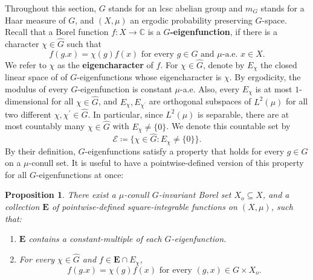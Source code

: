 \documentclass{amsart}
\numberwithin{equation}{subsection}
\newtheorem{prop}[thm]{Proposition}
\theoremstyle{remark}
\begin{document}
Throughout this section, \(G\) stands for an lcsc abelian group and \(m_{G}\) stands for a Haar measure of \(G\), and \(\left(X,\mu\right)\) an ergodic probability preserving \(G\)-space. Recall that a Borel function \(f:X\to\mathbb{C}\) is a {\bf \(G\)-eigenfunction}, if there is a character \(\chi\in\widehat{G}\) such that
\[f\left(g.x\right)=\chi\left(g\right)f\left(x\right)\text{ for every }g\in G\text{ and }\mu\text{-a.e. }x\in X.\]
We refer to \(\chi\) as the {\bf eigencharacter} of \(f\). For \(\chi\in\widehat{G}\), denote by \(E_{\chi}\) the closed linear space of of \(G\)-eigenfunctions whose eigencharacter is \(\chi\). By ergodicity, the modulus of every \(G\)-eigenfunction is constant \(\mu\)-a.e. Also, every \(E_{\chi}\) is at most \(1\)-dimensional for all \(\chi\in\widehat{G}\), and \(E_{\chi},E_{\chi^{\prime}}\) are orthogonal subspaces of \(L^{2}\left(\mu\right)\) for all two different  \(\chi,\chi^{\prime}\in\widehat{G}\). In particular, since \(L^{2}\left(\mu\right)\) is separable, there are at most countably many \(\chi\in\widehat{G}\) with \(E_{\chi}\neq\{0\}\). We denote this countable set by
\[\mathcal{E}\coloneqq \{\chi\in\widehat{G}:E_{\chi}\neq\{0\}\}.\]
By their definition, \(G\)-eigenfunctions satisfy a property that holds for every \(g\in G\) on a \(\mu\)-conull set. It is useful to have a pointwise-defined version of this property for all \(G\)-eigenfunctions at once:

\begin{prop}\label{prop:pointeig}
There exist a \(\mu\)-conull \(G\)-invariant Borel set \(X_{o}\subseteq X\), and a collection \(\mathbf{E}\) of pointwise-defined square-integrable functions on \(\left(X,\mu\right)\), such that:
\begin{enumerate}
    \item \(\mathbf{E}\) contains a constant-multiple of each \(G\)-eigenfunction.
    \item For every \(\chi\in\widehat{G}\) and \(f\in\mathbf{E}\cap E_{\chi}\),
    \[f\left(g.x\right)=\chi\left(g\right)f\left(x\right)\text{ for every }\left(g,x\right)\in G\times X_{o}.\]
\end{enumerate}
\end{prop}
\end{document}
